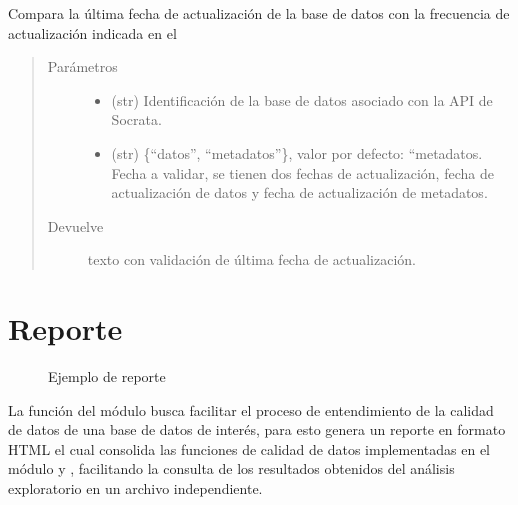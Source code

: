 \documentclass[letterpaper,10pt,openany,spanish]{sphinxmanual}
\begin{document}
\begin{fulllineitems}
\label{\detokenize{metadatos:metadatos.updated_data}}
Compara la última fecha de actualización de la base de datos con la frecuencia de actualización indicada en el 
\begin{quote}\begin{description}
\item[{Parámetros}] \leavevmode\begin{itemize}
\item {} 
 \textendash{} (str) Identificación de la base de datos asociado con la API de Socrata.

\item {} 
 \textendash{} (str) \{“datos”, “metadatos”\}, valor por defecto: “metadatos. Fecha a validar, se tienen dos fechas de actualización, fecha de actualización de datos y fecha de actualización de metadatos.

\end{itemize}

\item[{Devuelve}] \leavevmode
texto con validación de última fecha de actualización.

\end{description}\end{quote}

\end{fulllineitems}



\chapter{Reporte}
\label{\detokenize{reporte:reporte}}\label{\detokenize{reporte:id1}}\label{\detokenize{reporte::doc}}
\begin{figure}[htbp]
\centering
\capstart

\noindent{}
\caption{Ejemplo de reporte}\label{\detokenize{reporte:id2}}\end{figure}

La función  del módulo  busca facilitar el proceso de entendimiento de la calidad de datos de una base de datos de interés, para esto genera un reporte en formato HTML el cual consolida las funciones de calidad de datos implementadas en el módulo {\hyperref[\detokenize{datos:datos}]{}} y {\hyperref[\detokenize{metadatos:metadatos}]{}}, facilitando la consulta de los resultados obtenidos del análisis exploratorio en un archivo independiente.
\end{document}
